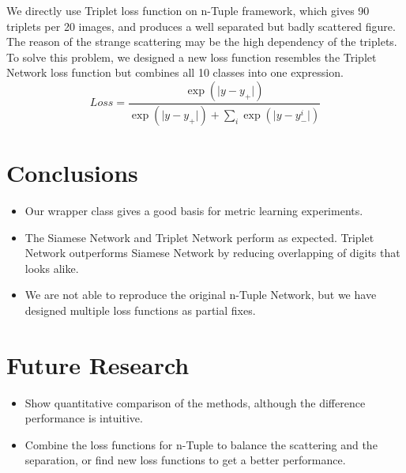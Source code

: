 \documentclass[a0,portrait]{a0poster}
\begin{document}
\begin{multicols}{2}
		We directly use Triplet loss function on n-Tuple framework, which gives 90 triplets per 20 images, and produces a well separated but badly scattered figure. The reason of the strange scattering may be the high dependency of the triplets. To solve this problem, we designed a new loss function resembles the Triplet Network loss function but combines all 10 classes into one expression. %
		\begin{equation}
		Loss = \frac{\exp{(\lvert y-y_+ \rvert)}}{\exp{(\lvert y-y_+ \rvert)} + \sum_i\exp{(\lvert y-y_-^i \rvert)}}
		\end{equation}
		
		\color{SaddleBrown} %
		\vspace{-1em}
		\section*{Conclusions}
		
		\begin{itemize}
			\item Our wrapper class gives a good basis for metric learning experiments.
			\item The Siamese Network and Triplet Network perform as expected. Triplet Network outperforms Siamese Network by reducing overlapping of digits that looks alike.
			\item We are not able to reproduce the original n-Tuple Network, but we have designed multiple loss functions as partial fixes.
		\end{itemize}
		
		\color{DarkSlateGray} %
		
		
		\section*{Future Research}
		\begin{itemize}
			\item Show quantitative comparison of the methods, although the difference performance is intuitive.
			\item Combine the loss functions for n-Tuple to balance the scattering and the separation, or find new loss functions to get a better performance.
		\end{itemize}
		
	\end{multicols}
\end{document}
